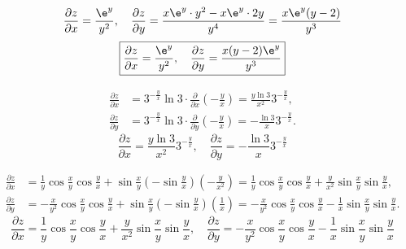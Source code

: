 \begin{solution}

    \begin{equation}
        \frac{\partial z}{\partial x} = \frac{\e^y}{y^2}, \quad \frac{\partial z}{\partial y} = \frac{x \e^y \cdot y^2 - x \e^y \cdot 2y}{y^4} = \frac{x \e^y(y - 2)}{y^3}
    \end{equation}
    \begin{equation}
        \boxed{\frac{\partial z}{\partial x} = \frac{\e^y}{y^2}, \quad \frac{\partial z}{\partial y} = \frac{x(y - 2)\e^y}{y^3}}
    \end{equation}


    \begin{equation}
        \begin{aligned}
            \frac{\partial z}{\partial x} & = 3^{-\frac{y}{x}} \ln 3 \cdot \frac{\partial}{\partial x}\left( -\frac{y}{x} \right) = \frac{y \ln 3}{x^2} 3^{-\frac{y}{x}}, \\
            \frac{\partial z}{\partial y} & = 3^{-\frac{y}{x}} \ln 3 \cdot \frac{\partial}{\partial y}\left( -\frac{y}{x} \right) = -\frac{\ln 3}{x} 3^{-\frac{y}{x}}.
        \end{aligned}
    \end{equation}
    \begin{equation}
        \boxed{\frac{\partial z}{\partial x} = \frac{y \ln 3}{x^2} 3^{-\frac{y}{x}}, \quad \frac{\partial z}{\partial y} = -\frac{\ln 3}{x} 3^{-\frac{y}{x}}}
    \end{equation}


    \begin{equation}
        \begin{aligned}
            \frac{\partial z}{\partial x} & = \frac{1}{y} \cos \frac{x}{y} \cos \frac{y}{x} + \sin \frac{x}{y} \left( -\sin \frac{y}{x} \right) \left( -\frac{y}{x^2} \right) = \frac{1}{y} \cos \frac{x}{y} \cos \frac{y}{x} + \frac{y}{x^2} \sin \frac{x}{y} \sin \frac{y}{x},  \\
            \frac{\partial z}{\partial y} & = -\frac{x}{y^2} \cos \frac{x}{y} \cos \frac{y}{x} + \sin \frac{x}{y} \left( -\sin \frac{y}{x} \right) \left( \frac{1}{x} \right) = -\frac{x}{y^2} \cos \frac{x}{y} \cos \frac{y}{x} - \frac{1}{x} \sin \frac{x}{y} \sin \frac{y}{x}.
        \end{aligned}
    \end{equation}
    \begin{equation}
        \boxed{\frac{\partial z}{\partial x} = \frac{1}{y} \cos \frac{x}{y} \cos \frac{y}{x} + \frac{y}{x^2} \sin \frac{x}{y} \sin \frac{y}{x}, \quad \frac{\partial z}{\partial y} = -\frac{x}{y^2} \cos \frac{x}{y} \cos \frac{y}{x} - \frac{1}{x} \sin \frac{x}{y} \sin \frac{y}{x}}
    \end{equation}


\end{solution}
